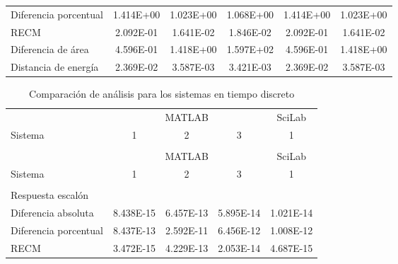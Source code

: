 {\begin{longtable}{l @{\extracolsep{\fill}} ccccc}
            Diferencia porcentual  & \num{1.414E+00} & \num{1.023E+00} & \num{1.068E+00} & \num{1.414E+00} & \num{1.023E+00}  \\
            RECM                   & \num{2.092E-01} & \num{1.641E-02} & \num{1.846E-02} & \num{2.092E-01} & \num{1.641E-02}  \\
            Diferencia de área     & \num{4.596E-01} & \num{1.418E+00} & \num{1.597E+02} & \num{4.596E-01} & \num{1.418E+00}  \\
            Distancia de energía   & \num{2.369E-02} & \num{3.587E-03} & \num{3.421E-03} & \num{2.369E-02} & \num{3.587E-03}  \\
        \end{longtable}}
        
        {\setlength\LTleft{0pt}
        \setlength\LTright{0pt}
        \scriptsize
        \centering
        \renewcommand{\arraystretch}{0.88}
        \begin{longtable}{l @{\extracolsep{\fill}} cccc}
            \caption[Comparación de análisis - tiempo discreto]{Comparación de análisis para los sistemas en tiempo discreto}
            \label{tab:AnalisisStepD} \\
            \toprule
                    & \multicolumn{3}{c}{MATLAB} & SciLab   \\ \cmidrule{2-4}\cmidrule{5-5}
            Sistema &   1     &    2     &    3  &   1      \\ \cmidrule{2-2}\cmidrule{3-3}\cmidrule{4-4}\cmidrule{5-5}
            & & & & \\
            \endfirsthead
            \toprule
                    & \multicolumn{3}{c}{MATLAB} & SciLab   \\ \cmidrule{2-4}\cmidrule{5-5}
            Sistema &   1     &    2     &    3  &   1      \\ \cmidrule{2-2}\cmidrule{3-3}\cmidrule{4-4}\cmidrule{5-5}
            & & & & \\
            \endhead
            \bottomrule
            \endfoot
            Respuesta escalón      & & & & \\ \cmidrule{1-1}
            Diferencia absoluta    & \num{8.438E-15} & \num{6.457E-13} & \num{5.895E-14} & \num{1.021E-14}  \\
            Diferencia porcentual  & \num{8.437E-13} & \num{2.592E-11} & \num{6.456E-12} & \num{1.008E-12}  \\
            RECM                   & \num{3.472E-15} & \num{4.229E-13} & \num{2.053E-14} & \num{4.687E-15}  \\

\end{longtable}}
